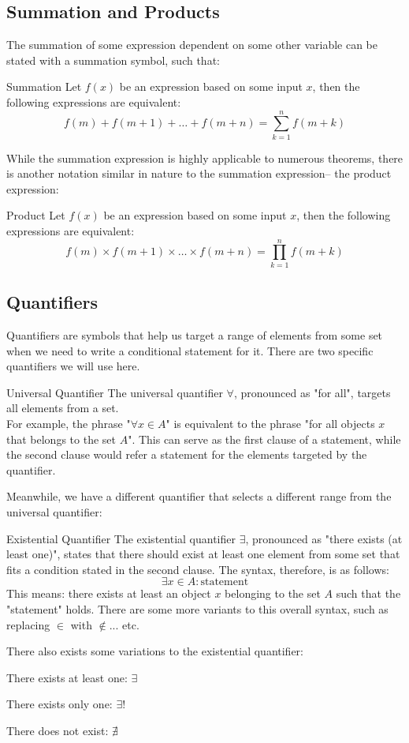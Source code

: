 \subsection{Summation and Products}
The summation of some expression dependent on some other variable can be stated with a summation symbol, such that:
\begin{ln-symbol}{Summation}{}
    Let $f(x)$ be an expression based on some input $x$, then the following expressions are equivalent:
    \[f(m) + f(m + 1) + \dots + f(m + n) = \sum_{k = 1}^{n} {f(m + k)}\]
\end{ln-symbol}
While the summation expression is highly applicable to numerous theorems, there is another notation similar in nature to the summation expression-- the product expression:
\begin{ln-symbol}{Product}{}
    Let $f(x)$ be an expression based on some input $x$, then the following expressions are equivalent:
    \[f(m) \times f(m + 1) \times \dots \times f(m + n) = \prod_{k = 1}^{n} {f(m + k)}\]
\end{ln-symbol}

\subsection{Quantifiers}
Quantifiers are symbols that help us target a range of elements from some set when we need to write a conditional statement for it. There are two specific quantifiers we will use here.
\begin{ln-symbol}{Universal Quantifier}{}
    The universal quantifier $\forall$, pronounced as "for all", targets all elements from a set. \\
    For example, the phrase "$\forall x \in A$" is equivalent to the phrase "for all objects $x$ that belongs to the set $A$". This can serve as the first clause of a statement, while the second clause would refer a statement for the elements targeted by the quantifier.
\end{ln-symbol}
Meanwhile, we have a different quantifier that selects a different range from the universal quantifier:
\begin{ln-symbol}{Existential Quantifier}{}
    The existential quantifier $\exists$, pronounced as "there exists (at least one)", states that there should exist at least one element from some set that fits a condition stated in the second clause. The syntax, therefore, is as follows:
    \[ \exists x \in A : \text{statement}\]
    This means: there exists at least an object $x$ belonging to the set $A$ such that the "statement" holds. There are some more variants to this overall syntax, such as replacing $\in$ with $\notin$... etc.
\end{ln-symbol}
There also exists some variations to the existential quantifier:
\begin{bindenum}
    \item There exists at least one: $\exists$
    \item There exists only one: $\exists!$
    \item There does not exist: $\nexists$
\end{bindenum}

